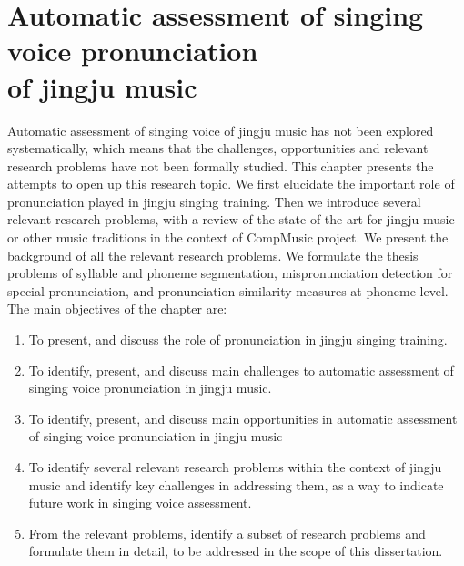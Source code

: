\chapter[Automatic assessment of singing voice pronunciation of jingju music
]{Automatic assessment of singing voice pronunciation\\of jingju music}\label{chap:probdef}

Automatic assessment of singing voice of jingju music has not been explored systematically, which means that the challenges, opportunities and relevant research problems have not been formally studied. This chapter presents the attempts to open up this research topic. We first elucidate the important role of pronunciation played in jingju singing training. Then we introduce several relevant research problems, with a review of the state of the art for jingju music or other music traditions in the context of CompMusic project. We present the background of all the relevant research problems. We formulate the thesis problems of syllable and phoneme segmentation, mispronunciation detection for special pronunciation, and pronunciation similarity measures at phoneme level. The main objectives of the chapter are:

\begin{enumerate}[leftmargin=*]
	\item To present, and discuss the role of pronunciation in jingju singing training.
	\item To identify, present, and discuss main challenges to automatic assessment of singing voice pronunciation in jingju music.
	\item To identify, present, and discuss main opportunities in automatic assessment of singing voice pronunciation in jingju music
	\item To identify several relevant research problems within the context of jingju music and identify key challenges in addressing them, as a way to indicate future work in singing voice assessment.
	\item From the relevant problems, identify a subset of research problems and formulate them in detail, to be addressed in the scope of this dissertation.
\end{enumerate}
%
